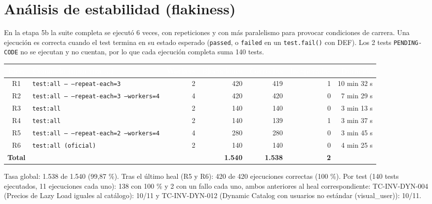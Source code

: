 \documentclass[10pt,a4paper]{article}
\newcommand{\tabhead}{\rowcolor{primary}}
\newcommand{\hcell}[1]{\textcolor{white}{\bfseries #1}}
\newcommand{\zebrarows}{\rowcolors{2}{zebra}{white}}
\begin{document}
\section{Análisis de estabilidad (flakiness)}
En la etapa 5b la suite completa se ejecutó 6 veces, con repeticiones y con más paralelismo para provocar condiciones de carrera. Una ejecución es correcta cuando el test termina en su estado esperado (\texttt{passed}, o \texttt{failed} en un \texttt{test.fail()} con DEF). Los 2 tests \texttt{PENDING-CODE} no se ejecutan y no cuentan, por lo que cada ejecución completa suma 140 tests.

{\zebrarows
\begin{tabularx}{\textwidth}{|c|Y|r|r|r|r|r|}
\hline
\tabhead \hcell{Ejec.} & \hcell{Comando (npm run ...)} & \hcell{Workers} & \hcell{Ejecuciones} & \hcell{Correctas} & \hcell{Inesperadas} & \hcell{Duración} \\ \hline
R1 & \texttt{test:all -- --repeat-each=3} & 2 & 420 & 419 & 1 & 10 min 32 s \\ \hline
R2 & \texttt{test:all -- --repeat-each=3 --workers=4} & 4 & 420 & 420 & 0 & 7 min 29 s \\ \hline
R3 & \texttt{test:all} & 2 & 140 & 140 & 0 & 3 min 13 s \\ \hline
R4 & \texttt{test:all} & 2 & 140 & 139 & 1 & 3 min 37 s \\ \hline
R5 & \texttt{test:all -- --repeat-each=2 --workers=4} & 4 & 280 & 280 & 0 & 3 min 45 s \\ \hline
R6 & \texttt{test:all (oficial)} & 2 & 140 & 140 & 0 & 4 min 25 s \\ \hline
\textbf{Total} &  &  & \textbf{1.540} & \textbf{1.538} & \textbf{2} &  \\ \hline
\end{tabularx}}

Tasa global: 1.538 de 1.540 (99,87 \%). Tras el último heal (R5 y R6): 420 de 420 ejecuciones correctas (100 \%). Por test (140 tests ejecutados, 11 ejecuciones cada uno): 138 con 100 \% y 2 con un fallo cada uno, ambos anteriores al heal correspondiente: TC-INV-DYN-004 (Precios de Lazy Load iguales al catálogo): 10/11 y TC-INV-DYN-012 (Dynamic Catalog con usuarios no estándar (visual\_\allowbreak{}user)): 10/11.
\end{document}
